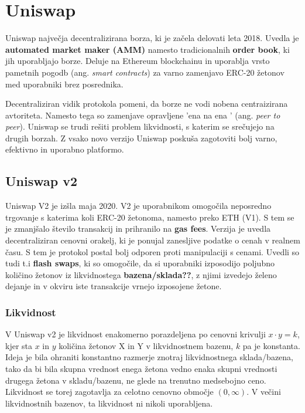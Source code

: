\documentclass[a4paper,12pt]{article}%
\begin{document}
 

\section{Uniswap}
Uniswap največja decentralizirana borza, ki je začela delovati leta 2018. Uvedla je \textbf{automated market maker (AMM)} namesto tradicionalnih \textbf{order book}, ki jih uporabljajo borze. Deluje na Ethereum blockchainu in uporablja vrsto pametnih pogodb (ang. \textit{smart contracts}) za varno zamenjavo ERC-20 žetonov med uporabniki brez posrednika. 

Decentraliziran vidik protokola pomeni, da borze ne vodi nobena centraizirana avtoriteta. Namesto tega so zamenjave opravljene 'ena na ena ' (ang. \textit{peer to peer}). Uniswap se trudi rešiti problem likvidnosti, s katerim se srečujejo na drugih borzah. Z vsako novo verzijo Uniswap poskuša zagotoviti bolj varno, efektivno in uporabno platformo. 






\subsection{Uniswap v2}
Uniswap V2 je izšla maja 2020. V2 je uporabnikom omogočila neposredno trgovanje s katerima koli ERC-20 žetonoma, namesto preko ETH (V1). S tem se je zmanjšalo število transakcij in prihranilo na \textbf{gas fees}. Verzija je uvedla decentraliziran cenovni orakelj, ki je ponujal zanesljive podatke o cenah v realnem času. S tem je protokol postal bolj odporen proti manipulaciji s cenami. Uvedli so tudi t.i \textbf{flash swaps}, ki so omogočile, da si uporabniki izposodijo poljubno količino žetonov iz likvidnostega \textbf{bazena/sklada??}, z njimi izvedejo želeno dejanje in v okviru iste transakcije vrnejo izposojene žetone. 

\subsubsection{Likvidnost} 
V Uniswap v2 je likvidnost enakomerno porazdeljena po cenovni krivulji $x\cdot y = k$, kjer sta $x$ in $y$ količina žetonov X in Y v likvidnostnem bazenu, $k$ pa je konstanta. Ideja je bila ohraniti konstantno razmerje znotraj likvidnostnega sklada/bazena, tako da bi bila skupna vrednost enega žetona vedno enaka skupni vrednosti drugega žetona v skladu/bazenu, ne glede na trenutno medsebojno ceno.  Likvidnost se torej zagotavlja za celotno cenovno območje $(0,\infty)$. V večini likvidnostnih bazenov, ta likvidnost ni nikoli uporabljena. 
\end{document}
